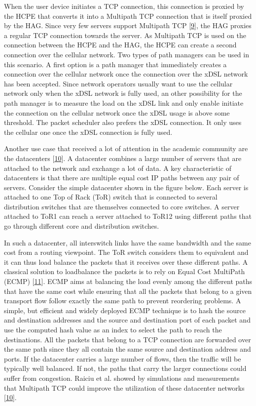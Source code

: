 \documentclass[letterpaper,10pt,english]{sphinxmanual}
\begin{document}
\sphinxAtStartPar
When the user device initiates a TCP connection, this connection is proxied by the HCPE that converts it into a Multipath TCP connection that is itself proxied by the HAG. Since very few servers support Multipath TCP {[}\hyperlink{cite.biblio:id9003}{9}{]}, the HAG proxies a regular TCP connection towards the server. As Multipath TCP is used on the connection between the HCPE and the HAG, the HCPE can create a second connection over the cellular network. Two types of path managers can be used in this scenario. A first option is a path manager that immediately creates a connection over the cellular network once the connection over the xDSL network has been accepted. Since network operators usually want to use the cellular network only when the xDSL network is fully used, an other possibility for the path manager is to measure the load on the xDSL link and only enable initiate the connection on the cellular network once the xDSL usage is above some threshold. The packet scheduler also prefers the xDSL connection. It only uses the cellular one once the xDSL connection is fully used.

\sphinxAtStartPar
Another use case that received a lot of attention in the academic community are the datacenters {[}\hyperlink{cite.biblio:id8933}{10}{]}. A datacenter combines a large number of servers that are attached to the network and exchange a lot of data. A key characteristic of datacenters is that there are multiple equal cost IP paths between any pair of servers. Consider the simple datacenter shown in the figure below. Each server is attached to one Top of Rack (ToR) switch that is connected to several distribution switches that are themselves connected to core switches. A server attached to ToR1 can reach a server attached to ToR12 using different paths that go through different core and distribution switches.

\sphinxAtStartPar
In such a datacenter, all inter\sphinxhyphen{}switch links have the same bandwidth and the same cost from a routing viewpoint. The ToR switch considers them to equivalent and it can thus load balance the packets that it receives over these different paths. A classical solution to load\sphinxhyphen{}balance the packets is to rely on Equal Cost MultiPath (ECMP) {[}\hyperlink{cite.biblio:id2922}{11}{]}. ECMP aims at balancing the load evenly among the different paths that have the same cost while ensuring that all the packets that belong to a given transport flow follow exactly the same path to prevent reordering problems. A simple, but efficient and widely deployed ECMP technique is to hash the source and destination addresses and the source and destination port of each packet and use the computed hash value as an index to select the path to reach the destinations. All the packets that belong to a TCP connection are forwarded over the same path since they all contain the same source and destination address and ports. If the datacenter carries a large number of flows, then the traffic will be typically well balanced. If not, the paths that carry the larger connections could suffer from congestion. Raiciu et al. showed by simulations and measurements that Multipath TCP could improve the utilization of these datacenter networks {[}\hyperlink{cite.biblio:id8933}{10}{]}.
\end{document}
